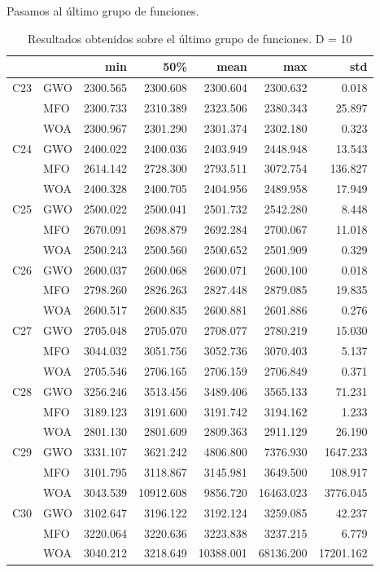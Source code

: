 \documentclass[
  a4paper,
,tablecaptionabove
]{scrartcl}
\begin{document}
Pasamos al último grupo de funciones.

\begin{longtable}{llrrrrr}
\caption{Resultados obtenidos sobre el último grupo de funciones. D = 10} \\
\toprule
    &     &      min &       50\% &      mean &       max &       std \\
\midrule
C23 & GWO & 2300.565 &  2300.608 &  2300.604 &  2300.632 &     0.018 \\
    & MFO & 2300.733 &  2310.389 &  2323.506 &  2380.343 &    25.897 \\
    & WOA & 2300.967 &  2301.290 &  2301.374 &  2302.180 &     0.323 \\
\midrule
C24 & GWO & 2400.022 &  2400.036 &  2403.949 &  2448.948 &    13.543 \\
    & MFO & 2614.142 &  2728.300 &  2793.511 &  3072.754 &   136.827 \\
    & WOA & 2400.328 &  2400.705 &  2404.956 &  2489.958 &    17.949 \\
\midrule
C25 & GWO & 2500.022 &  2500.041 &  2501.732 &  2542.280 &     8.448 \\
    & MFO & 2670.091 &  2698.879 &  2692.284 &  2700.067 &    11.018 \\
    & WOA & 2500.243 &  2500.560 &  2500.652 &  2501.909 &     0.329 \\
\midrule
C26 & GWO & 2600.037 &  2600.068 &  2600.071 &  2600.100 &     0.018 \\
    & MFO & 2798.260 &  2826.263 &  2827.448 &  2879.085 &    19.835 \\
    & WOA & 2600.517 &  2600.835 &  2600.881 &  2601.886 &     0.276 \\
\midrule
C27 & GWO & 2705.048 &  2705.070 &  2708.077 &  2780.219 &    15.030 \\
    & MFO & 3044.032 &  3051.756 &  3052.736 &  3070.403 &     5.137 \\
    & WOA & 2705.546 &  2706.165 &  2706.159 &  2706.849 &     0.371 \\
\midrule
C28 & GWO & 3256.246 &  3513.456 &  3489.406 &  3565.133 &    71.231 \\
    & MFO & 3189.123 &  3191.600 &  3191.742 &  3194.162 &     1.233 \\
    & WOA & 2801.130 &  2801.609 &  2809.363 &  2911.129 &    26.190 \\
\midrule
C29 & GWO & 3331.107 &  3621.242 &  4806.800 &  7376.930 &  1647.233 \\
    & MFO & 3101.795 &  3118.867 &  3145.981 &  3649.500 &   108.917 \\
    & WOA & 3043.539 & 10912.608 &  9856.720 & 16463.023 &  3776.045 \\
\midrule
C30 & GWO & 3102.647 &  3196.122 &  3192.124 &  3259.085 &    42.237 \\
    & MFO & 3220.064 &  3220.636 &  3223.838 &  3237.215 &     6.779 \\
    & WOA & 3040.212 &  3218.649 & 10388.001 & 68136.200 & 17201.162 \\
\bottomrule
\end{longtable}
\end{document}
